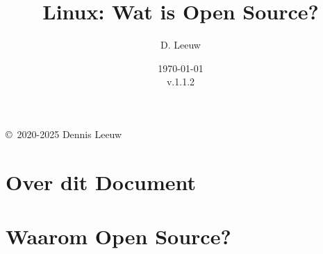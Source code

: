 \documentclass[a4paper,12pt,twoside,openright,titlepage]{book}
\author{D. Leeuw}
\title{Linux: Wat is Open Source?}
\date{\today\\v.1.1.2}
\begin{document}

\maketitle

\copyright\ 2020-2025 Dennis Leeuw\\




\frontmatter
\chapter{Over dit Document}
%
%

\tableofcontents

\mainmatter

\chapter{Waarom Open Source?}


\backmatter
\printindex
\end{document}
